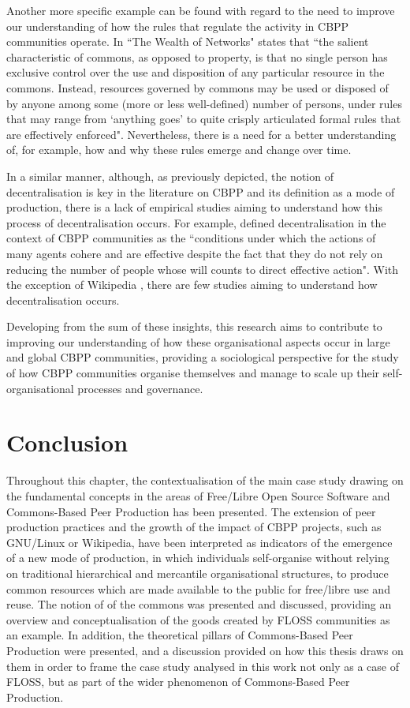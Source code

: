 Another more specific example can be found with regard to the need to improve our understanding of how the rules that regulate the activity in CBPP communities operate. In ``The Wealth of Networks" \textcite[61]{benkler2006wealth} states that ``the salient characteristic of commons, as opposed to property, is that no single person has exclusive control over the use and disposition of any particular resource in the commons. Instead, resources governed by commons may be used or disposed of by anyone among some (more or less well-defined) number of persons, under rules that may range from `anything goes' to quite crisply articulated formal rules that are effectively enforced". Nevertheless, there is a need for a better understanding of, for example, how and why these rules emerge and change over time.

In a similar manner, although, as previously depicted, the notion of decentralisation is key in the literature on CBPP and its definition as a mode of production, there is a lack of empirical studies aiming to understand how this process of decentralisation occurs. For example, \textcite[62]{benkler2006wealth} defined decentralisation in the context of  CBPP communities as the ``conditions under which the actions of many agents cohere and are effective despite the fact that they do not rely on reducing the number of people whose will counts to direct effective action". With the exception of Wikipedia \parencite{viegas2007hidden, forte2009decentralization}, there are few studies aiming to understand how decentralisation occurs.

Developing from the sum of these insights, this research aims to contribute to improving our understanding of how these organisational aspects occur in large and global CBPP communities, providing a sociological perspective for the study of how CBPP communities organise themselves and manage to scale up their self-organisational processes and governance.

\section{Conclusion}

Throughout this chapter, the contextualisation of the main case study drawing on the fundamental concepts in the areas of Free\slash Libre Open Source Software and Commons-Based Peer Production has been presented. The extension of peer production practices and the growth of the impact of CBPP projects, such as GNU/Linux or Wikipedia, have been interpreted as indicators of the emergence of a new mode of production, in which individuals self-organise without relying on traditional hierarchical and mercantile organisational structures, to produce common resources which are made available to the public for free/libre use and reuse. The notion of of the commons was presented and discussed, providing an overview and conceptualisation of the goods created by FLOSS communities as an example. In addition, the theoretical pillars of Commons-Based Peer Production were presented, and a discussion provided on how this thesis draws on them in order to frame the case study analysed in this work not only as a case of FLOSS, but as part of the wider phenomenon of Commons-Based Peer Production.

